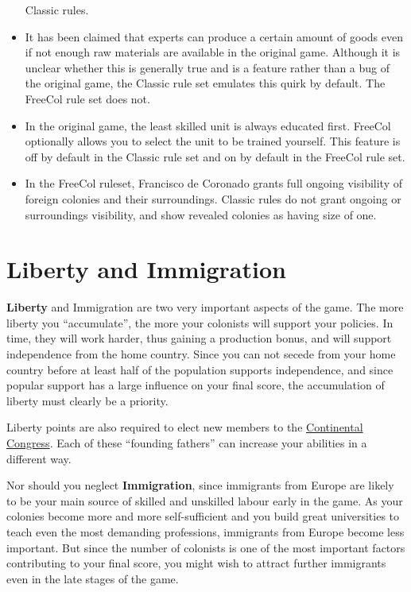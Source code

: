 \documentclass[12pt]{book}
\newcommand{\Concept}[1]{\index{#1}\hypertarget{#1}{\textbf{#1}}}
\begin{document}
\begin{itemize}
  Classic rules.
\item It has been claimed that experts can produce a certain amount of
  goods even if not enough raw materials are available in the original
  game. Although it is unclear whether this is generally true and is a
  feature rather than a bug of the original game, the Classic rule set
  emulates this quirk by default. The FreeCol rule set does not.
\item In the original game, the least skilled unit is always educated
  first. FreeCol optionally allows you to select the unit to be
  trained yourself. This feature is off by default in the Classic
  rule set and on by default in the FreeCol rule set.
\item In the FreeCol ruleset, Francisco de Coronado grants full
  ongoing visibility of foreign colonies and their surroundings. Classic
  rules do not grant ongoing or surroundings visibility, and show
  revealed colonies as having size of one.
\end{itemize}


\hypertarget{Liberty and Immigration}{\section{Liberty and Immigration}}

\Concept{Liberty} and Immigration are two very important aspects of
the game. The more liberty you ``accumulate'', the more your colonists
will support your policies. In time, they will work harder, thus
gaining a production bonus, and will support independence from the
home country. Since you can not secede from your home country before
at least half of the population supports independence, and since
popular support has a large influence on your final score, the
accumulation of liberty must clearly be a priority.

Liberty points are also required to elect new members to the
\hyperlink{Continental Congress}{Continental Congress}. Each of these
``founding fathers'' can increase your abilities in a different way.

Nor should you neglect \Concept{Immigration}, since immigrants from
Europe are likely to be your main source of skilled and unskilled
labour early in the game. As your colonies become more and more
self-sufficient and you build great universities to teach even the
most demanding professions, immigrants from Europe become less
important. But since the number of colonists is one of the most
important factors contributing to your final score, you might wish to
attract further immigrants even in the late stages of the game.
\end{document}
